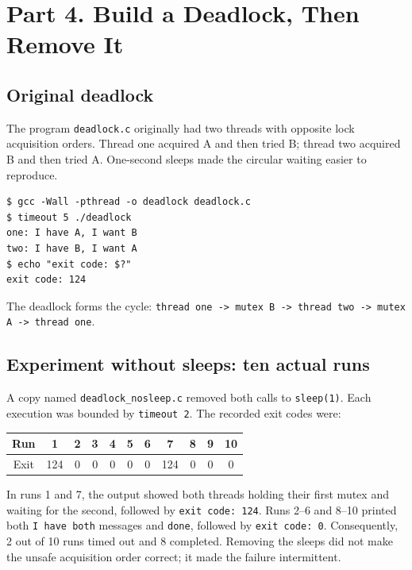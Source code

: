 \documentclass[12pt,a4paper]{article}
\begin{document}
\section{Part 4. Build a Deadlock, Then Remove It}
\subsection{Original deadlock}
The program \texttt{deadlock.c} originally had two threads with opposite lock acquisition orders. Thread one acquired A and then tried B; thread two acquired B and then tried A. One-second sleeps made the circular waiting easier to reproduce.
\begin{lstlisting}
$ gcc -Wall -pthread -o deadlock deadlock.c
$ timeout 5 ./deadlock
one: I have A, I want B
two: I have B, I want A
$ echo "exit code: $?"
exit code: 124
\end{lstlisting}
The deadlock forms the cycle: \texttt{thread one -> mutex B -> thread two -> mutex A -> thread one}.

\subsection{Experiment without sleeps: ten actual runs}
A copy named \texttt{deadlock\_nosleep.c} removed both calls to \texttt{sleep(1)}. Each execution was bounded by \texttt{timeout 2}. The recorded exit codes were:
\begin{center}
\begin{tabular}{c*{10}{c}}
\toprule
Run & 1 & 2 & 3 & 4 & 5 & 6 & 7 & 8 & 9 & 10 \\
\midrule
Exit & 124 & 0 & 0 & 0 & 0 & 0 & 124 & 0 & 0 & 0 \\
\bottomrule
\end{tabular}
\end{center}
\noindent In runs 1 and 7, the output showed both threads holding their first mutex and waiting for the second, followed by \texttt{exit code: 124}. Runs 2--6 and 8--10 printed both \texttt{I have both} messages and \texttt{done}, followed by \texttt{exit code: 0}. Consequently, 2 out of 10 runs timed out and 8 completed. Removing the sleeps did not make the unsafe acquisition order correct; it made the failure intermittent.
\end{document}
